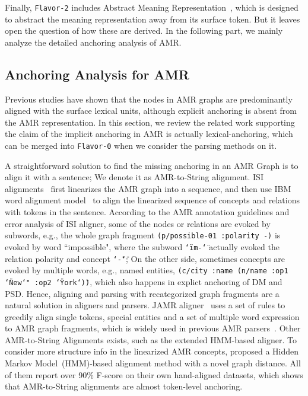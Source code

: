 Finally, \texttt{Flavor-2} includes Abstract Meaning
Representation~\cite[AMR,][]{Banarescu:LWPjKI7N}, which is designed to
abstract the meaning representation away from its surface token. But
it leaves open the question of how these are derived. In the following
part, we mainly analyze the detailed anchoring analysis of AMR.

\subsection{Anchoring Analysis for AMR}
\label{ssec:lex-phr:amr-anchor}
Previous studies have shown that the nodes in AMR graphs are
predominantly aligned with the surface lexical units, although
explicit anchoring is absent from the AMR representation.  In this
section, we review the related work supporting the claim of the
implicit anchoring in AMR is actually lexical-anchoring, which can be
merged into \texttt{Flavor-0} when we consider the parsing methods on
it.

 A straightforward solution to
find the missing anchoring in an AMR Graph is to align it with a
sentence; We denote it as AMR-to-String alignment. ISI
alignments~\cite{Pourdamghani:2014aligning} first linearizes the AMR
graph into a sequence, and then use IBM word alignment
model~\cite{brown1993mathematics} to align the linearized sequence of
concepts and relations with tokens in the sentence. According to the
AMR annotation guidelines and error analysis of ISI aligner, some of
the nodes or relations are evoked by subwords, e.g., the whole graph
fragment \texttt{(p/possible-01 :polarity -)} is evoked by word
``impossible", where the subword \texttt{\char`\"im-\char`\"} actually
evoked the relation polarity and concept \texttt{\char`\"-\char`\"};
On the other side, sometimes concepts are evoked by multiple words,
e.g., named entities, \texttt{(c/city :name (n/name :op1
  \char`\"New\char`" :op2 \char`\"York\char`\"))}, which also happens
in explict anchoring of DM and PSD. Hence, aligning and parsing with
recategorized graph fragments are a natural solution in aligners and
parsers. JAMR aligner~\cite{Flanigan:2014vc} uses a set of rules to
greedily align single tokens, special entities and a set of multiple
word expression to AMR graph fragments, which is widely used in
previous AMR
parsers~\cite[\eg][]{Flanigan:2014vc,Wang:2015uo,Artzi:2009tb,Pust:2015ug,Peng:2015tj,Konstas:2017uj,Wang:2017vt}. Other
AMR-to-String Alignments exists, such as the extended HMM-based
aligner. To consider more structure info in the linearized AMR
concepts, \citet{Wang:2017vt} proposed a Hidden Markov
Model~(HMM)-based alignment method with a novel graph distance. All of
them report over 90\% F-score on their own hand-aligned datasets,
which shows that AMR-to-String alignments are almost token-level
anchoring.


